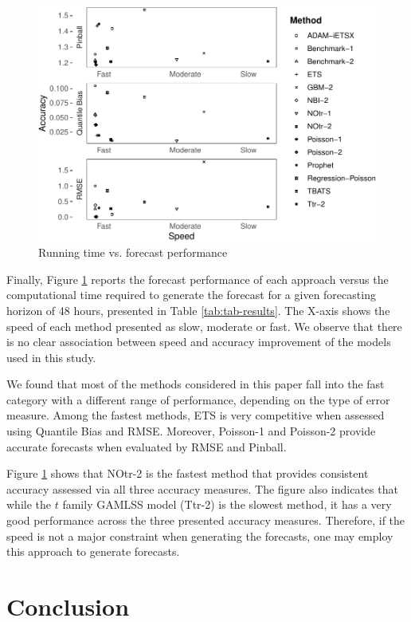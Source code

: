 \documentclass[]{elsarticle} %
\begin{document}
\begin{figure}[H]

{\centering \includegraphics[width=0.7\linewidth]{paper_files/figure-latex/time-accuracy-1} 

}

\caption{Running time vs. forecast performance}\label{fig:time-accuracy}
\end{figure}

Finally, Figure \ref{fig:time-accuracy} reports the forecast performance of each approach versus the computational time required to generate the forecast for a given forecasting horizon of 48 hours, presented in Table \ref{tab:tab-results}. The X-axis shows the speed of each method presented as slow, moderate or fast. We observe that there is no clear association between speed and accuracy improvement of the models used in this study.

We found that most of the methods considered in this paper fall into the fast category with a different range of performance, depending on the type of error measure. Among the fastest methods, ETS is very competitive when assessed using Quantile Bias and RMSE. Moreover, Poisson-1 and Poisson-2 provide accurate forecasts when evaluated by RMSE and Pinball.

Figure \ref{fig:time-accuracy} shows that NOtr-2 is the fastest method that provides consistent accuracy assessed via all three accuracy measures. The figure also indicates that while the \(t\) family GAMLSS model (Ttr-2) is the slowest method, it has a very good performance across the three presented accuracy measures. Therefore, if the speed is not a major constraint when generating the forecasts, one may employ this approach to generate forecasts.

\hypertarget{conclusion}{%
\section{Conclusion}\label{conclusion}}
\end{document}

